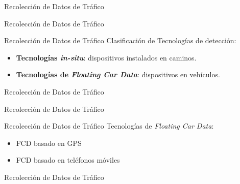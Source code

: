 \begin{frame}[c]{Recolección de Datos de Tráfico}
	\begin{center}
		\huge{Recolección de Datos de Tráfico}
    \end{center}
\end{frame}

\begin{frame}[c]{Recolección de Datos de Tráfico}
	\large{Clasificación de Tecnologías de detección:}
	\vspace{\baselineskip}
	\begin{center}
	 \begin{itemize}	 	
	 	\item \textbf{Tecnologías \emph{in-situ}}: dispositivos instalados en caminos.
	 	\vspace{\baselineskip}
	 	\item \textbf{Tecnologías de \emph{Floating Car Data}}: dispositivos en vehículos.
	 \end{itemize}			
	\end{center}
\end{frame}


\begin{frame}[c]{Recolección de Datos de Tráfico}
	\begin{figure}[h]
		\centering
		
		\captionsetup{singlelinecheck=off}
		\caption[Configuraciones de detección intrusiva]{}
		\label{fig:intrusiva} 
	\end{figure}
\end{frame}

\begin{frame}[c]{Recolección de Datos de Tráfico}
	\begin{figure}[h]
		\centering
		
		\captionsetup{singlelinecheck=off}
		\caption[Configuraciones de detección no intrusiva]{}
		\label{fig:intrusiva} 
	\end{figure}
\end{frame}

\begin{frame}[c]{Recolección de Datos de Tráfico}
	\large{Tecnologías de \emph{Floating Car Data}:}
	\vspace{\baselineskip}
	\begin{center}
		\begin{itemize}	 	
			\item FCD basado en GPS	
			\vspace{\baselineskip}
			\item FCD basado en teléfonos móviles
		\end{itemize}			
	\end{center}
\end{frame}

\begin{frame}[c]{Recolección de Datos de Tráfico}
	\begin{figure}[h]
		\centering
		
		\captionsetup{singlelinecheck=off}
		\caption[Configuraciones FCD]{}
		\label{fig:intrusiva} 
	\end{figure}
\end{frame}